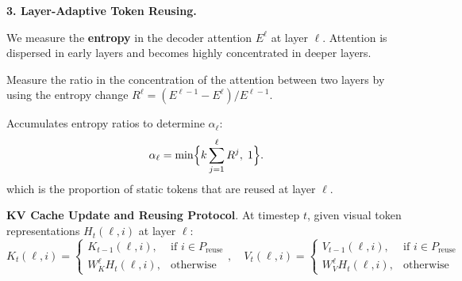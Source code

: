 \begin{dashlist}
    \item \textbf{3. Layer-Adaptive Token Reusing.}
    \begin{dashlist}
        \item We measure the \textbf{entropy} in the decoder attention $E^\ell$ at layer $\ell$. Attention is dispersed in early layers and becomes highly concentrated in deeper layers.
        \item Measure the ratio in the concentration of the attention between two layers by using the entropy change $R^{\ell} = (E^{\ell-1} - E^{\ell}) / E^{\ell-1}$.
        \item Accumulates entropy ratios to determine $\alpha_{\ell}$:
        \[
        \alpha_{\ell} = \min\Bigl\{k \sum_{j=1}^{\ell} R^j, \; 1\Bigr\} .
        \]
        which is the proportion of static tokens that are reused at layer $\ell$.
    \end{dashlist}
    \item  \textbf{KV Cache Update and Reusing Protocol}. At timestep $t$, given visual token representations $H_t(\ell, i)$ at layer $\ell$:
    \[
    K_t(\ell, i) = \begin{cases}
    K_{t-1}(\ell, i), & \text{if } i \in P_{\text{reuse}} \\
    W_K^{\ell} H_t(\ell, i), & \text{otherwise}
    \end{cases}, \quad
    V_t(\ell, i) = \begin{cases}
    V_{t-1}(\ell, i), & \text{if } i \in P_{\text{reuse}} \\
    W_V^{\ell} H_t(\ell, i), & \text{otherwise}
    \end{cases}
    \]
\end{dashlist}
